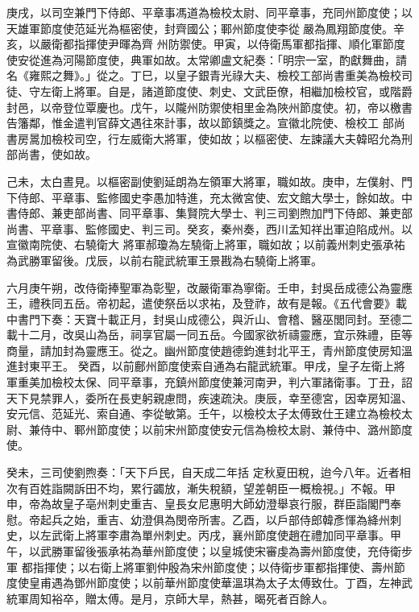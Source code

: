 \begin{pinyinscope}
 庚戌，以司空兼門下侍郎、平章事馮道為檢校太尉、同平章事，充同州節度使；以天雄軍節度使范延光為樞密使，封齊國公；鄆州節度使李從嚴為鳳翔節度使。辛亥，以嚴衛都指揮使尹暉為齊
 州防禦使。甲寅，以侍衛馬軍都指揮、順化軍節度使安從進為河陽節度使，典軍如故。太常卿盧文紀奏：「明宗一室，酌獻舞曲，請名《雍熙之舞》。」從之。丁巳，以皇子銀青光祿大夫、檢校工部尚書重美為檢校司徒、守左衛上將軍。自是，諸道節度使、刺史、文武臣僚，相繼加檢校官，或階爵封邑，以帝登位覃慶也。戊午，以隴州防禦使相里金為陜州節度使。初，帝以檄書告籓鄰，惟金遣判官薛文遇往來計事，故以節鎮獎之。宣徽北院使、檢校工
 部尚書房暠加檢校司空，行左威衛大將軍，使如故；以樞密使、左諫議大夫韓昭允為刑部尚書，使如故。



 己未，太白晝見。以樞密副使劉延朗為左領軍大將軍，職如故。庚申，左僕射、門下侍郎、平章事、監修國史李愚加特進，充太微宮使、宏文館大學士，餘如故。中書侍郎、兼吏部尚書、同平章事、集賢院大學士、判三司劉煦加門下侍郎、兼吏部尚書、平章事、監修國史、判三司。癸亥，秦州奏，西川孟知祥出軍迫陷成州。以宣徽南院使、右驍衛大
 將軍郝瓊為左驍衛上將軍，職如故；以前義州刺史張承祐為武勝軍留後。戊辰，以前右龍武統軍王景戡為右驍衛上將軍。



 六月庚午朔，改侍衛捧聖軍為彰聖，改嚴衛軍為寧衛。壬申，封吳岳成德公為靈應王，禮秩同五岳。帝初起，遣使祭岳以求祐，及登祚，故有是報。《五代會要》載中書門下奏：天寶十載正月，封吳山成德公，與沂山、會稽、醫巫閭同封。至德二載十二月，改吳山為岳，祠享官屬一同五岳。今國家欲祈禱靈應，宜示殊禮，臣等商量，請加封為靈應王。從之。幽州節度使趙德鈞進封北平王，青州節度使房知溫進封東平王。
 癸酉，以前鄜州節度使索自通為右龍武統軍。甲戌，皇子左衛上將軍重美加檢校太保、同平章事，充鎮州節度使兼河南尹，判六軍諸衛事。丁丑，詔天下見禁罪人，委所在長吏躬親慮問，疾速疏決。庚辰，幸至德宮，因幸房知溫、安元信、范延光、索自通、李從敏第。壬午，以檢校太子太傅致仕王建立為檢校太尉、兼侍中、鄆州節度使；以前宋州節度使安元信為檢校太尉、兼侍中、潞州節度使。



 癸未，三司使劉煦奏：「天下戶民，自天成二年括
 定秋夏田稅，迨今八年。近者相次有百姓詣闕訴田不均，累行蠲放，漸失稅額，望差朝臣一概檢視。」不報。甲申，帝為故皇子亳州刺史重吉、皇長女尼惠明大師幼澄舉哀行服，群臣詣閣門奉慰。帝起兵之始，重吉、幼澄俱為閔帝所害。乙酉，以戶部侍郎韓彥惲為絳州刺史，以左武衛上將軍李肅為單州刺史。丙戌，襄州節度使趙在禮加同平章事。甲午，以武勝軍留後張承祐為華州節度使；以皇城使宋審虔為壽州節度使，充侍衛步軍
 都指揮使；以右衛上將軍劉仲殷為宋州節度使；以侍衛步軍都指揮使、壽州節度使皇甫遇為鄧州節度使；以前華州節度使華溫琪為太子太傅致仕。丁酉，左神武統軍周知裕卒，贈太傅。是月，京師大旱，熱甚，暍死者百餘人。




\end{pinyinscope}

